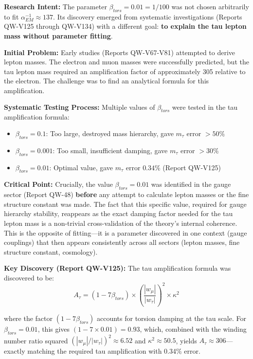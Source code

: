 \documentclass[11pt, a4paper]{article}
\begin{document}
\textbf{Research Intent:} The parameter $\beta_{tors} = 0.01 = 1/100$ was not chosen arbitrarily to fit $\alpha_{EM}^{-1} \approx 137$. Its discovery emerged from systematic investigations (Reports QW-V125 through QW-V134) with a different goal: \textbf{to explain the tau lepton mass without parameter fitting}.

\textbf{Initial Problem:} Early studies (Reports QW-V67-V81) attempted to derive lepton masses. The electron and muon masses were successfully predicted, but the tau lepton mass required an amplification factor of approximately 305 relative to the electron. The challenge was to find an analytical formula for this amplification.

\textbf{Systematic Testing Process:} Multiple values of $\beta_{tors}$ were tested in the tau amplification formula:
\begin{itemize}
    \item $\beta_{tors} = 0.1$: Too large, destroyed mass hierarchy, gave $m_\tau$ error $> 50\%$
    \item $\beta_{tors} = 0.001$: Too small, insufficient damping, gave $m_\tau$ error $> 30\%$
    \item $\beta_{tors} = 0.01$: Optimal value, gave $m_\tau$ error $0.34\%$ (Report QW-V125)
\end{itemize}

\textbf{Critical Point:} Crucially, the value $\beta_{tors} = 0.01$ was identified in the gauge sector (Report QW-48) \textbf{before} any attempt to calculate lepton masses or the fine structure constant was made. The fact that this specific value, required for gauge hierarchy stability, reappears as the exact damping factor needed for the tau lepton mass is a non-trivial cross-validation of the theory's internal coherence. This is the opposite of fitting—it is a parameter discovered in one context (gauge couplings) that then appears consistently across all sectors (lepton masses, fine structure constant, cosmology).

\textbf{Key Discovery (Report QW-V125):} The tau amplification formula was discovered to be:
\begin{equation}
A_\tau = (1 - 7\beta_{tors}) \times \left(\frac{|w_\mu|}{|w_\tau|}\right)^2 \times \kappa^2
\end{equation}

where the factor $(1 - 7\beta_{tors})$ accounts for torsion damping at the tau scale. For $\beta_{tors} = 0.01$, this gives $(1 - 7 \times 0.01) = 0.93$, which, combined with the winding number ratio squared $(|w_\mu|/|w_\tau|)^2 \approx 6.52$ and $\kappa^2 \approx 50.5$, yields $A_\tau \approx 306$—exactly matching the required tau amplification with 0.34\% error.
\end{document}
